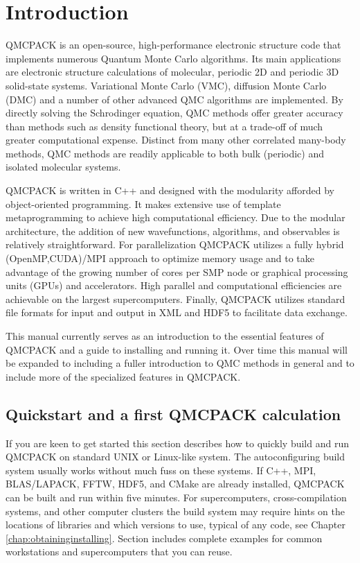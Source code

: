 \chapter{Introduction}
\label{chap:introduction}

QMCPACK is an open-source, high-performance electronic structure code
that implements numerous Quantum Monte Carlo algorithms. Its main
applications are electronic structure calculations of molecular,
periodic 2D and periodic 3D solid-state systems. Variational Monte
Carlo (VMC), diffusion Monte Carlo (DMC) and a number of other
advanced QMC algorithms are implemented. By directly solving the
Schrodinger equation, QMC methods offer greater accuracy than methods
such as density functional theory, but at a trade-off of much greater
computational expense. Distinct from many other correlated many-body
methods, QMC methods are readily applicable to both bulk
(periodic) and isolated molecular systems.

QMCPACK is written in C++ and designed with the modularity afforded by
object-oriented programming. It makes extensive use of template
metaprogramming to achieve high computational efficiency. Due to the
modular architecture, the addition of new wavefunctions, algorithms,
and observables is relatively straightforward. For parallelization
QMCPACK utilizes a fully hybrid (OpenMP,CUDA)/MPI approach to optimize
memory usage and to take advantage of the growing number of cores per
SMP node or graphical processing units (GPUs) and accelerators. High
parallel and computational efficiencies are achievable on the largest
supercomputers. Finally, QMCPACK utilizes standard file formats for
input and output in XML and HDF5 to facilitate data exchange.

This manual currently serves as an introduction to the essential features
of QMCPACK and a guide to installing and running it. Over time this
manual will be expanded to including a fuller introduction to QMC
methods in general and to include more of the specialized features in
QMCPACK.

\section{Quickstart and a first QMCPACK calculation}
If you are keen to get started this section describes how to quickly
build and run QMCPACK on standard UNIX or Linux-like system. The
autoconfiguring build system usually works without much fuss on these
systems.  If C++, MPI, BLAS/LAPACK, FFTW, HDF5, and CMake are already
installed, QMCPACK can be built and run within five minutes. For
supercomputers, cross-compilation systems, and other computer clusters
the build system may require hints on the locations of libraries and
which versions to use, typical of any code, see Chapter
\ref{chap:obtaininginstalling}. Section \label{sec:installexamples}
includes complete examples for common workstations and supercomputers that you can reuse.


